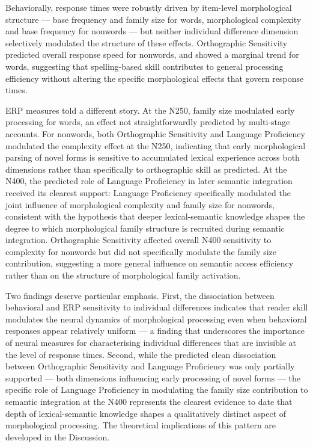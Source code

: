 Behaviorally, response times were robustly driven by item-level morphological structure — base frequency and family size for words, morphological complexity and base frequency for nonwords — but neither individual difference dimension selectively modulated the structure of these effects. Orthographic Sensitivity predicted overall response speed for nonwords, and showed a marginal trend for words, suggesting that spelling-based skill contributes to general processing efficiency without altering the specific morphological effects that govern response times.

ERP measures told a different story. At the N250, family size modulated early processing for words, an effect not straightforwardly predicted by multi-stage accounts. For nonwords, both Orthographic Sensitivity and Language Proficiency modulated the complexity effect at the N250, indicating that early morphological parsing of novel forms is sensitive to accumulated lexical experience across both dimensions rather than specifically to orthographic skill as predicted. At the N400, the predicted role of Language Proficiency in later semantic integration received its clearest support: Language Proficiency specifically modulated the joint influence of morphological complexity and family size for nonwords, consistent with the hypothesis that deeper lexical-semantic knowledge shapes the degree to which morphological family structure is recruited during semantic integration. Orthographic Sensitivity affected overall N400 sensitivity to complexity for nonwords but did not specifically modulate the family size contribution, suggesting a more general influence on semantic access efficiency rather than on the structure of morphological family activation.

Two findings deserve particular emphasis. First, the dissociation between behavioral and ERP sensitivity to individual differences indicates that reader skill modulates the neural dynamics of morphological processing even when behavioral responses appear relatively uniform — a finding that underscores the importance of neural measures for characterising individual differences that are invisible at the level of response times. Second, while the predicted clean dissociation between Orthographic Sensitivity and Language Proficiency was only partially supported — both dimensions influencing early processing of novel forms — the specific role of Language Proficiency in modulating the family size contribution to semantic integration at the N400 represents the clearest evidence to date that depth of lexical-semantic knowledge shapes a qualitatively distinct aspect of morphological processing. The theoretical implications of this pattern are developed in the Discussion.

